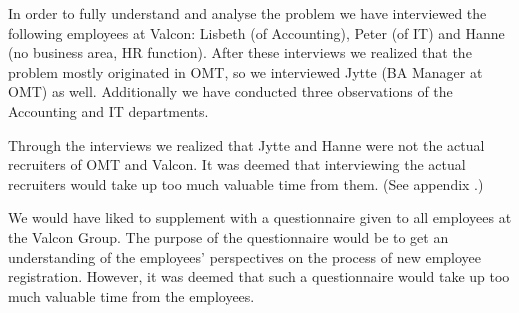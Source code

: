 In order to fully understand and analyse the problem we have interviewed the following employees at Valcon:
Lisbeth (of Accounting), Peter (of IT) and Hanne (no business area, HR function).
After these interviews we realized that the problem mostly originated in OMT, so we interviewed Jytte (BA Manager at OMT) as well.
Additionally we have conducted three observations of the Accounting and IT departments.

Through the interviews we realized that Jytte and Hanne were not the actual recruiters of OMT and Valcon.
It was deemed that interviewing the actual recruiters would take up too much valuable time from them.
(See appendix .)

We would have liked to supplement with a questionnaire given to all employees at the Valcon Group.
The purpose of the questionnaire would be to get an understanding of the employees' perspectives on the process of new employee registration.
However, it was deemed that such a questionnaire would take up too much valuable time from the employees.